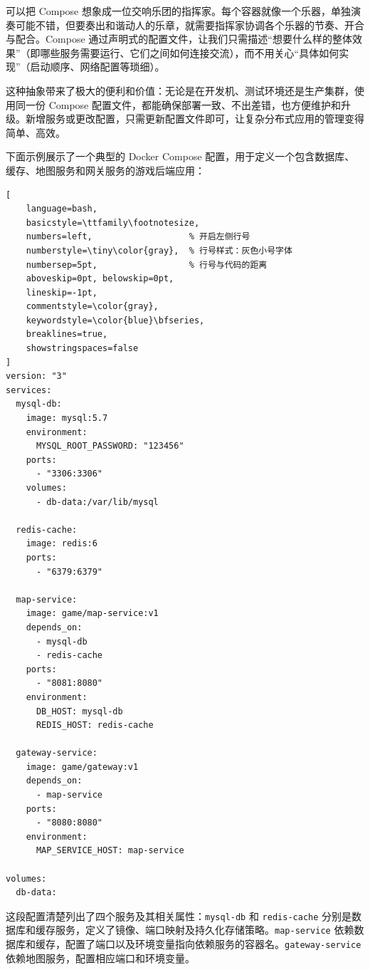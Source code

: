 可以把 Compose 想象成一位交响乐团的指挥家。每个容器就像一个乐器，单独演奏可能不错，但要奏出和谐动人的乐章，就需要指挥家协调各个乐器的节奏、开合与配合。Compose 通过声明式的配置文件，让我们只需描述“想要什么样的整体效果”（即哪些服务需要运行、它们之间如何连接交流），而不用关心“具体如何实现”（启动顺序、网络配置等琐细）。

这种抽象带来了极大的便利和价值：无论是在开发机、测试环境还是生产集群，使用同一份 Compose 配置文件，都能确保部署一致、不出差错，也方便维护和升级。新增服务或更改配置，只需更新配置文件即可，让复杂分布式应用的管理变得简单、高效。

下面示例展示了一个典型的 Docker Compose 配置，用于定义一个包含数据库、缓存、地图服务和网关服务的游戏后端应用：

\begin{tcolorbox}[title=Docker Compose 配置示例]
\begin{lstlisting}[
    language=bash,
    basicstyle=\ttfamily\footnotesize,
    numbers=left,                   % 开启左侧行号
    numberstyle=\tiny\color{gray},  % 行号样式：灰色小号字体
    numbersep=5pt,                  % 行号与代码的距离
    aboveskip=0pt, belowskip=0pt,
    lineskip=-1pt,
    commentstyle=\color{gray},
    keywordstyle=\color{blue}\bfseries,
    breaklines=true,
    showstringspaces=false
]
version: "3"
services:
  mysql-db:
    image: mysql:5.7
    environment:
      MYSQL_ROOT_PASSWORD: "123456"
    ports:
      - "3306:3306"
    volumes:
      - db-data:/var/lib/mysql

  redis-cache:
    image: redis:6
    ports:
      - "6379:6379"

  map-service:
    image: game/map-service:v1
    depends_on:
      - mysql-db
      - redis-cache
    ports:
      - "8081:8080"
    environment:
      DB_HOST: mysql-db
      REDIS_HOST: redis-cache

  gateway-service:
    image: game/gateway:v1
    depends_on:
      - map-service
    ports:
      - "8080:8080"
    environment:
      MAP_SERVICE_HOST: map-service

volumes:
  db-data:
\end{lstlisting}
\end{tcolorbox}

这段配置清楚列出了四个服务及其相关属性：\texttt{mysql-db} 和 \texttt{redis-cache} 分别是数据库和缓存服务，定义了镜像、端口映射及持久化存储策略。\texttt{map-service} 依赖数据库和缓存，配置了端口以及环境变量指向依赖服务的容器名。\texttt{gateway-service} 依赖地图服务，配置相应端口和环境变量。

